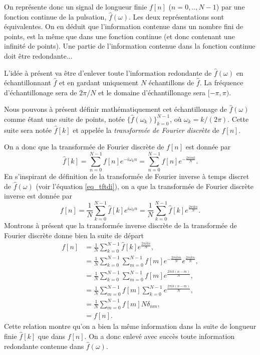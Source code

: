 \documentclass[a4paper,12pt]{book}
\newcommand{\fh}{\hat{f}}
\renewcommand{\eqref}[1]{\ref{#1}}
\begin{document}
On représente donc un signal de longueur finie $f[n]$ ($n=0,..,N-1$) par une fonction
continue de la pulsation, $\fh(\omega)$. Les deux représentations sont équivalentes. On en
déduit que l'information contenue dans un nombre fini de points, est la même que dans une
fonction continue (et donc contenant une infinité de points). 
Une partie de l'information contenue dans la fonction continue doit être redondante...

L'idée à présent va être d'enlever toute l'information redondante de $\fh(\omega)$ en
échantillonnant $\fh$ et en gardant uniquement $N$ échantillons de $\fh$. La fréquence 
d'échantillonage sera de $2\pi/N$ et le domaine d'échantillonage sera $[-\pi,\pi)$.

Nous pouvons à présent définir mathématiquement cet échantillonage de $\fh(\omega)$ comme
étant une suite de points, notée $\{\fh(\omega_k)\}_{k=0}^{N-1}$, où $\omega_k=k/(2\pi)$.
Cette suite sera notée $\fh[k]$ et appelée la \textit{transformée de Fourier discrète} de
$f[n]$.

On a donc que la transformée de Fourier discrète de $f[n]$ est donnée par
\begin{equation}
 \fh[k]=\sum_{n=0}^{N-1} f[n] e^{-i\omega_k n}
       =\sum_{n=0}^{N-1} f[n] e^{-\frac{2\pi i n k}{N}}.\label{eq_tfd}
\end{equation}
En s'inspirant de définition de la transformée de Fourier inverse à temps discret de
$\fh(\omega)$ (voir l'équation \eqref{eq_tftdi}), on a que la transformée de Fourier
discrète inverse est donnée par
\begin{equation}
 f[n]=\frac{1}{N}\sum_{k=0}^{N-1} \fh[k] e^{i\omega_k n}
 =\frac{1}{N}\sum_{k=0}^{N-1} \fh[k] e^{\frac{2\pi i k n}{N}}.
\end{equation}
Montrons à présent que la transformée inverse discrète de la transformée de Fourier 
discrète donne bien la suite de départ
\begin{align}
 f[n]&=\frac{1}{N}\sum_{k=0}^{N-1} \fh[k] e^{\frac{2\pi i k n}{N}},\nonumber\\
 &=\frac{1}{N}\sum_{k=0}^{N-1} \sum_{m=0}^{N-1} f[m] e^{-\frac{2\pi i k m}{N}} e^{\frac{2\pi i k n}{N}},\nonumber\\
 &=\frac{1}{N}\sum_{k=0}^{N-1} \sum_{m=0}^{N-1} f[m] e^{\frac{2\pi i k (n-m)}{N}},\nonumber\\
 &=\frac{1}{N}\sum_{m=0}^{N-1} f[m] \sum_{k=0}^{N-1} e^{\frac{2\pi i k (n-m)}{N}},\nonumber\\
 &=\frac{1}{N}\sum_{m=0}^{N-1} f[m] N \delta_{nm},\nonumber\\
 &=f[n].
\end{align}
Cette relation montre qu'on a bien la même information dans la suite de longueur finie 
$\fh[k]$ que dans $f[n]$. On a donc enlevé avec succès toute information redondante contenue
dans $\fh(\omega)$. 
\end{document}
